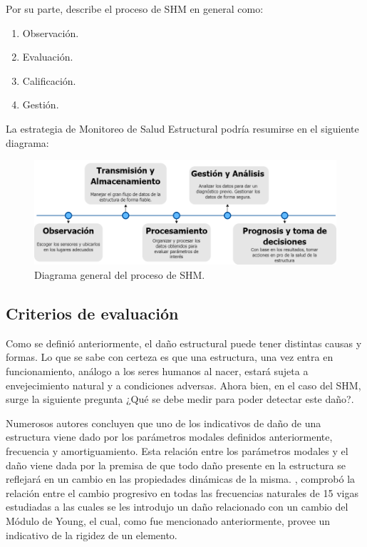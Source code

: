 Por su parte, \citet{chen2018} describe el proceso de SHM en general como:

\begin{enumerate}
    \item Observación.
    \item Evaluación.
    \item Calificación.
    \item Gestión.
\end{enumerate}

La estrategia de Monitoreo de Salud Estructural podría resumirse en el siguiente diagrama:

\begin{figure}[H]
    \centering
    \includegraphics[width = \textwidth]{imagenes/cap1_marcoteo/Diagrama SHM timeline.png}
    \caption{Diagrama general del proceso de SHM.}
    \label{fig:diag_SHM}
\end{figure}

\subsection{Criterios de evaluación}

Como se definió anteriormente, el daño estructural puede tener distintas causas y formas. Lo que se sabe con certeza es que una estructura, una vez entra en funcionamiento, análogo a los seres humanos al nacer, estará sujeta a envejecimiento natural y a condiciones adversas. Ahora bien, en el caso del SHM, surge la siguiente pregunta ¿Qué se debe medir para poder detectar este daño?. 

Numerosos autores concluyen que uno de los indicativos de daño de una estructura viene dado por los parámetros modales definidos anteriormente, frecuencia y amortiguamiento. Esta relación entre los parámetros modales y el daño viene dada por la premisa de que todo daño presente en la estructura se reflejará en un cambio en las propiedades dinámicas de la misma. \citet{worden2009modal}, comprobó la relación entre el cambio progresivo en todas las frecuencias naturales de 15 vigas estudiadas a las cuales se les introdujo un daño relacionado con un cambio del Módulo de Young, el cual, como fue mencionado anteriormente, provee un indicativo de la rigidez de un elemento.

